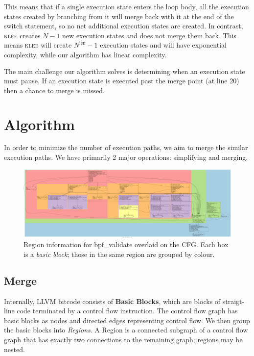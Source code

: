 \documentclass[12pt,a4paper]{article}
\newcommand{\klee}{\textsc{klee }}
\begin{document}
This means that if a single execution state enters the loop body, all the execution states created by branching from it will merge back with it at the end of the switch statement, so no net additional execution states are created. In contrast, \klee creates $N-1$ new execution states and does not merge them back. This means \klee will create $N^\text{len} - 1$ execution states and will have exponential complexity, while our algorithm has linear complexity.

The main challenge our algorithm solves is determining when an execution state must pause. If an execution state is executed past the merge point (at line 20) then a chance to merge is missed.

\section{Algorithm}\label{algorithm}
In order to minimize the number of execution paths, we aim to merge the similar execution paths. We have primarily 2 major operations: simplifying and merging.

\begin{figure}[h!]
  \centering
    \includegraphics[width=\textwidth]{reg.png}
  \caption{Region information for bpf\_validate overlaid on the CFG. Each box is a \emph{basic block}; those in the same region are grouped by colour.}
\end{figure}

\subsection{Merge}
Internally, LLVM bitcode consists of \textbf{Basic Blocks}, which are blocks of straigt-line code terminated by a control flow instruction. The control flow graph has basic blocks as nodes and directed edges representing control flow. We then group the basic blocks into \emph{Regions}. A Region is a connected subgraph of a control flow graph that has exactly two connections to the remaining graph; regions may be nested. 
\end{document}
